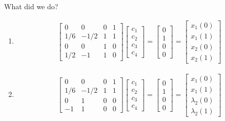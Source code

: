 \documentclass[letterpaper,12pt,titlepage]{report}
\theoremstyle{plain}
\theoremstyle{definition}
\begin{document}
\noindent
What did we do?
\begin{enumerate}[label=Case \arabic*:,itemindent=1cm]
\item \mbox{}
  \begin{gather}
    \begin{bmatrix}
      0 & 0 & 0 & 1 \\
      1/6 & -1/2 & 1 & 1 \\
      0 & 0 & 1 & 0 \\
      1/2 & -1 & 1 & 0
    \end{bmatrix}
    \begin{bmatrix}
      c_1 \\ c_2 \\ c_3 \\ c_4
    \end{bmatrix}
    =
    \begin{bmatrix}
      0 \\ 1 \\ 0 \\ 0
    \end{bmatrix}
    =
    \begin{bmatrix}
      x_1(0) \\ x_1(1) \\ x_2(0) \\ x_2(1)
    \end{bmatrix}
  \end{gather}
\item \mbox{}
  \begin{gather}
    \begin{bmatrix}
      0 & 0 & 0 & 1 \\
      1/6 & -1/2 & 1 & 1 \\
      0 & 1 & 0 & 0 \\
      -1 & 1 & 0 & 0
    \end{bmatrix}
    \begin{bmatrix}
      c_1 \\ c_2 \\ c_3 \\ c_4
    \end{bmatrix}
    =
    \begin{bmatrix}
      0 \\ 1 \\ 0 \\ 0
    \end{bmatrix}
    =
    \begin{bmatrix}
      x_1(0) \\ x_1(1) \\ \lambda_2(0) \\ \lambda_2(1)
    \end{bmatrix}
  \end{gather}
\end{enumerate}
\end{document}
